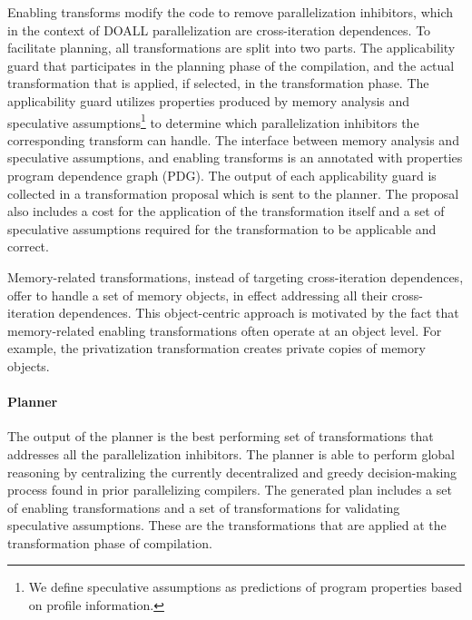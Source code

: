 Enabling transforms modify the code to remove parallelization
inhibitors, which in the context of DOALL parallelization are
cross-iteration dependences.
%
To facilitate planning, all transformations are split into two parts.
The applicability guard that participates in the planning phase of the
compilation, and the actual transformation that is applied, if
selected, in the transformation phase.
The applicability guard utilizes properties produced by memory
analysis and speculative assumptions\footnote{We define speculative
assumptions as predictions of program properties based on profile
information.} to determine which parallelization inhibitors the
corresponding transform can handle.
%
The interface between memory analysis and speculative assumptions, and
enabling transforms is an annotated with properties program dependence
graph (PDG).
%
%
The output of each applicability guard is collected in a
transformation proposal which is sent to the planner.
%
%
The proposal also includes a cost for the application of the
transformation itself and a set of speculative assumptions required
for the transformation to be applicable and correct.

Memory-related transformations, instead of targeting cross-iteration
dependences, offer to handle a set of memory objects, in effect
addressing all their cross-iteration dependences. This object-centric
approach is motivated by the fact that memory-related enabling
transformations often operate at an object level. For example, the
privatization transformation creates private copies of memory objects.

\paragraph{Planner}

%
The output of the planner is the best performing set of
transformations that addresses all the parallelization inhibitors.
%
The planner is able to perform global reasoning by centralizing the
currently decentralized and greedy decision-making process found in
prior parallelizing compilers.
%
The generated plan includes a set of enabling transformations and a
set of transformations for validating speculative assumptions.
%
These are the transformations that are applied at the transformation
phase of compilation.


